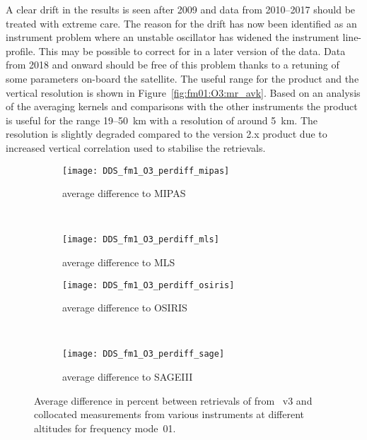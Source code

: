 A clear drift in the results is seen after 2009 and data from 2010--2017 should
be treated with extreme care. The reason for the  drift has now been identified
as an instrument problem where an unstable oscillator has widened the
instrument line-profile.  This may be possible to correct for in a later
version of the data.  Data from 2018 and onward should be free of this problem
thanks to a retuning  of some parameters on-board the satellite.  The useful
range for the product and the vertical resolution is shown in
Figure~\ref{fig:fm01:O3:mr_avk}.  Based on an analysis of the averaging kernels and 
comparisons with the other instruments the product is useful for the range 19--50~km
with a resolution of around 5~km. The resolution is slightly degraded compared
to the version 2.x product due to increased vertical correlation used to
stabilise the retrievals.


\begin{figure}[tbhp]
    \centering
    \begin{subfigure}[b]{0.49\textwidth}
        \texttt{[image: DDS\_fm1\_O3\_perdiff\_mipas]}
        \caption{average difference to MIPAS}
        \label{fig:fm01:O3:profiles:MIPAS}
    \end{subfigure}
    \,
    \begin{subfigure}[b]{0.49\textwidth}
        \texttt{[image: DDS\_fm1\_O3\_perdiff\_mls]}
        \caption{average difference to MLS}
        \label{fig:fm01:O3:profiles:MLS}
    \end{subfigure}

    \begin{subfigure}[b]{0.49\textwidth}
        \texttt{[image: DDS\_fm1\_O3\_perdiff\_osiris]}
        \caption{average difference to OSIRIS}
        \label{fig:fm01:O3:profiles:OSIRIS}
    \end{subfigure}
    \,
    \begin{subfigure}[b]{0.49\textwidth}
        \texttt{[image: DDS\_fm1\_O3\_perdiff\_sage]}
        \caption{average difference to SAGEIII}
        \label{fig:fm01:O3:profiles:SAGEIII}
    \end{subfigure}
    \caption{Average difference in percent between retrievals of 
    from \smr~v3 and collocated measurements from various instruments at
    different altitudes for frequency mode~01.}
    \label{fig:fm01:O3:profiles}
\end{figure}

